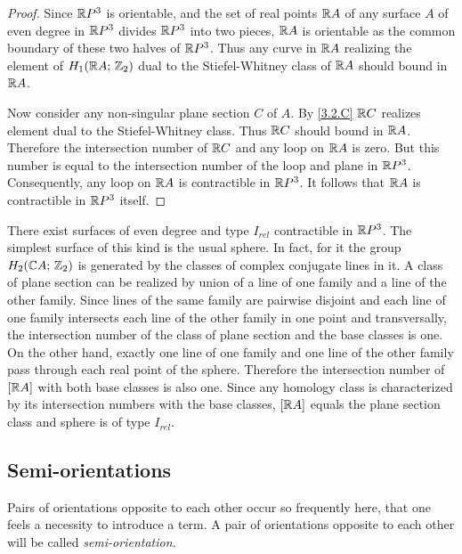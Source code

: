 \documentclass{article}
\numberwithin{equation}{section}
\begin{document}
\begin{proof} Since $\mathbb R P^3$ is orientable, and the set of real points
$\mathbb R A$ of any surface $A$ of even degree in $\mathbb R P^3$ divides $\mathbb R P^3$
into two pieces, $\mathbb R A$ is orientable as the common boundary of these
two halves of $\mathbb R P^3$. Thus any curve in $\mathbb R A$ realizing the element
of $H_1(\mathbb R A;\,\mathbb Z_2)$ dual to the Stiefel-Whitney class of $\mathbb R A$ should
bound in $\mathbb R A$.

Now consider any non-singular plane section $C$ of $A$.
By \ref{3.2.C}  $\mathbb R C$ realizes element dual to the Stiefel-Whitney class.
Thus $\mathbb R C$ should bound in $\mathbb R A$. Therefore the intersection number of
$\mathbb R C$ and any loop on $\mathbb R A$ is zero. But this number is equal
to the intersection number of the loop and plane in $\mathbb R P^3$.
Consequently, any loop on $\mathbb R A$ is contractible in $\mathbb R P^3$. It follows
that $\mathbb R A$ is contractible in $\mathbb R P^3$ itself. %
\end{proof}

 There exist surfaces of even degree and type $I_{rel}$
contractible in $\mathbb R P^3$. The simplest surface of this kind is the
usual sphere. In fact, for it the group $H_2(\mathbb C A;\,\mathbb Z_2)$ is generated
by the classes of complex conjugate lines in it. A class of plane
section can be realized by union of a line of one family and a line of
the other family. Since lines of the same family are pairwise disjoint
and each line of one family intersects each line of the other family in
one point and transversally, the intersection number of the class of
plane section and the base classes is one. On the other hand,
exactly one line of one family and one line of the other family pass
through each real point of the sphere. Therefore the intersection
number of $[\mathbb R A]$ with both base classes is also one. Since any homology
class is characterized by its intersection numbers with the
base classes, $[\mathbb R A]$ equals the plane section class and
sphere is of type $I_{rel}$.\medskip


\subsection{Semi-orientations}\label{s3.3}   
Pairs of orientations opposite to
each other occur so frequently here, that one feels a necessity to
introduce a term. A pair of orientations opposite to each other will be
called {\it semi-orientation.\/}
\end{document}
